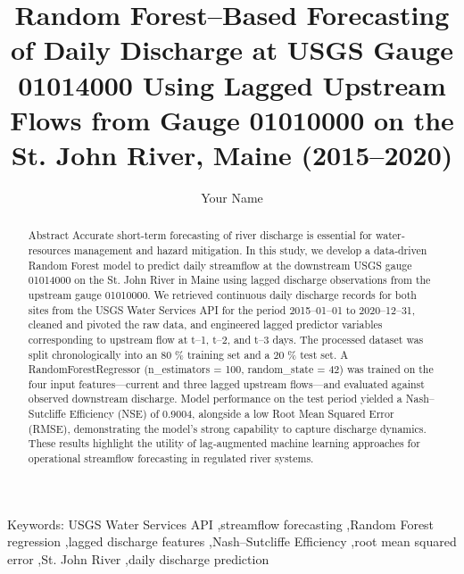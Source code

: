 \documentclass[preprint,12pt]{elsarticle}
\begin{document}
\begin{frontmatter}

\title{Random Forest–Based Forecasting of Daily Discharge at USGS Gauge 01014000 Using Lagged Upstream Flows from Gauge 01010000 on the St. John River, Maine (2015–2020)}

\author[1]{Your Name}

\begin{abstract}
Abstract  
Accurate short‐term forecasting of river discharge is essential for water‐resources management and hazard mitigation. In this study, we develop a data‐driven Random Forest model to predict daily streamflow at the downstream USGS gauge 01014000 on the St. John River in Maine using lagged discharge observations from the upstream gauge 01010000. We retrieved continuous daily discharge records for both sites from the USGS Water Services API for the period 2015–01–01 to 2020–12–31, cleaned and pivoted the raw data, and engineered lagged predictor variables corresponding to upstream flow at t–1, t–2, and t–3 days. The processed dataset was split chronologically into an 80 \% training set and a 20 \% test set. A RandomForestRegressor (n\_estimators = 100, random\_state = 42) was trained on the four input features—current and three lagged upstream flows—and evaluated against observed downstream discharge. Model performance on the test period yielded a Nash–Sutcliffe Efficiency (NSE) of 0.9004, alongside a low Root Mean Squared Error (RMSE), demonstrating the model's strong capability to capture discharge dynamics. These results highlight the utility of lag‐augmented machine learning approaches for operational streamflow forecasting in regulated river systems.
\end{abstract}

\begin{keyword}
Keywords: USGS Water Services API \sep streamflow forecasting \sep Random Forest regression \sep lagged discharge features \sep Nash–Sutcliffe Efficiency \sep root mean squared error \sep St. John River \sep daily discharge prediction
\end{keyword}

\end{frontmatter}

\end{document}
